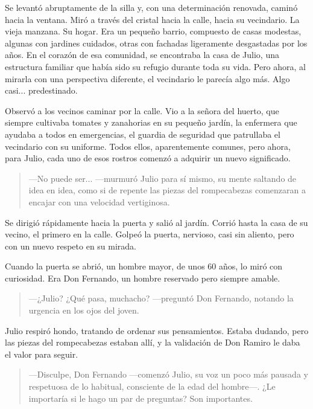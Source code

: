 \documentclass[a4paper,12pt]{book}
\begin{document}
Se levantó abruptamente de la silla y, con una determinación renovada, caminó hacia la ventana. Miró a través del cristal hacia la calle, hacia su vecindario. La vieja manzana. Su hogar. Era un pequeño barrio, compuesto de casas modestas, algunas con jardines cuidados, otras con fachadas ligeramente desgastadas por los años. En el corazón de esa comunidad, se encontraba la casa de Julio, una estructura familiar que había sido su refugio durante toda su vida. Pero ahora, al mirarla con una perspectiva diferente, el vecindario le parecía algo más. Algo casi... predestinado.

Observó a los vecinos caminar por la calle. Vio a la señora del huerto, que siempre cultivaba tomates y zanahorias en su pequeño jardín, la enfermera que ayudaba a todos en emergencias, el guardia de seguridad que patrullaba el vecindario con su uniforme. Todos ellos, aparentemente comunes, pero ahora, para Julio, cada uno de esos rostros comenzó a adquirir un nuevo significado.

\begin{quote}
    —No puede ser... —murmuró Julio para sí mismo, su mente saltando de idea en idea, como si de repente las piezas del rompecabezas comenzaran a encajar con una velocidad vertiginosa.
\end{quote}

Se dirigió rápidamente hacia la puerta y salió al jardín. Corrió hasta la casa de su vecino, el primero en la calle. Golpeó la puerta, nervioso, casi sin aliento, pero con un nuevo respeto en su mirada.

Cuando la puerta se abrió, un hombre mayor, de unos 60 años, lo miró con curiosidad. Era Don Fernando, un hombre reservado pero siempre amable.

\begin{quote}
    —¿Julio? ¿Qué pasa, muchacho? —preguntó Don Fernando, notando la urgencia en los ojos del joven.
\end{quote}

Julio respiró hondo, tratando de ordenar sus pensamientos. Estaba dudando, pero las piezas del rompecabezas estaban allí, y la validación de Don Ramiro le daba el valor para seguir.

\begin{quote}
    —Disculpe, Don Fernando —comenzó Julio, su voz un poco más pausada y respetuosa de lo habitual, consciente de la edad del hombre—. ¿Le importaría si le hago un par de preguntas? Son importantes.
\end{quote}
\end{document}
